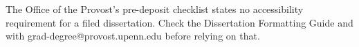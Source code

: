 %




	{The Office of the Provost's pre-deposit checklist states no accessibility
	 requirement for a filed dissertation. Check the Dissertation Formatting
	 Guide and with grad-degree@provost.upenn.edu before relying on that.}

